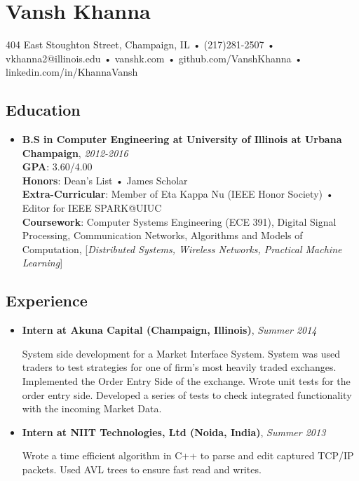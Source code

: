 \documentclass[]{article}
\author{}
\date{}
\begin{document}
\section{Vansh Khanna}

404 East Stoughton Street, Champaign, IL • (217)281-2507 •
vkhanna2@illinois.edu • vanshk.com • github.com/VanshKhanna •
linkedin.com/in/KhannaVansh

\subsection{Education}

\begin{itemize}
\item
  \textbf{B.S in Computer Engineering at University of Illinois at
  Urbana Champaign}, \emph{2012-2016}\\ \textbf{GPA}: 3.60/4.00\\
  \textbf{Honors}: Dean's List • James Scholar\\
  \textbf{Extra-Curricular}: Member of Eta Kappa Nu (IEEE Honor Society)
  • Editor for IEEE SPARK@UIUC\\ \textbf{Coursework}: Computer Systems
  Engineering (ECE 391), Digital Signal Processing, Communication
  Networks, Algorithms and Models of Computation, {[}\emph{Distributed
  Systems, Wireless Networks, Practical Machine Learning}{]}
\end{itemize}

\subsection{Experience}

\begin{itemize}
\item
  \textbf{Intern at Akuna Capital (Champaign, Illinois)}, \emph{Summer
  2014}

  System side development for a Market Interface System. System was used
  traders to test strategies for one of firm's most heavily traded
  exchanges. Implemented the Order Entry Side of the exchange. Wrote
  unit tests for the order entry side. Developed a series of tests to
  check integrated functionality with the incoming Market Data.
\item
  \textbf{Intern at NIIT Technologies, Ltd (Noida, India)}, \emph{Summer
  2013}

  Wrote a time efficient algorithm in C++ to parse and edit captured
  TCP/IP packets. Used AVL trees to ensure fast read and writes.
\end{itemize}
\end{document}
